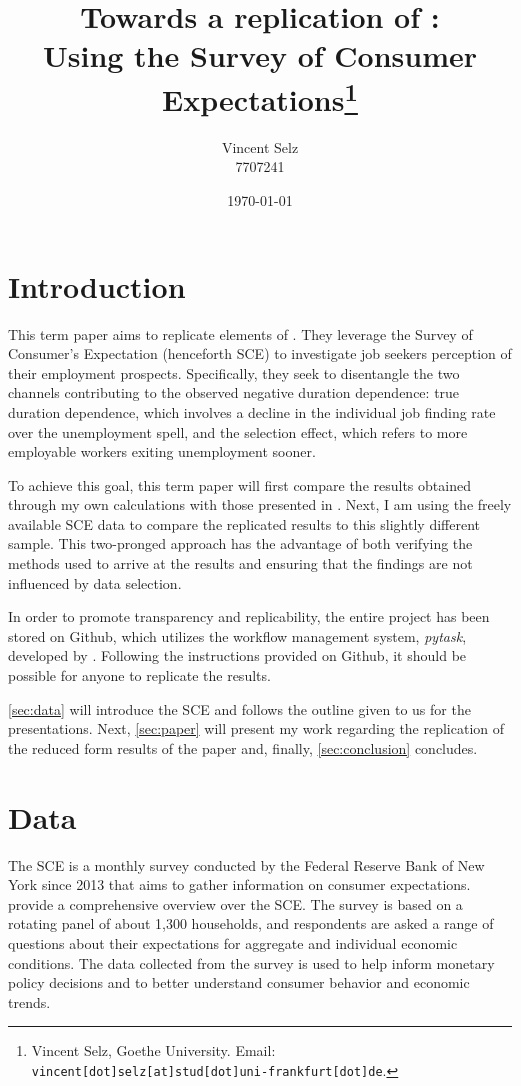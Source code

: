 \documentclass[11pt,a4paper,leqno]{article}
\title{Towards a replication of \textcite{MST2021}:  \\ Using the Survey of Consumer Expectations\thanks{Vincent Selz, Goethe University. Email: \texttt{vincent[dot]selz[at]stud[dot]uni-frankfurt[dot]de}. } }
\author{Vincent Selz \\ 7707241}
\date{
	\today
}
\begin{document}
\clearpage
\maketitle
\thispagestyle{empty}

\clearpage
\section{Introduction}
\setcounter{page}{1}
This term paper aims to replicate elements of \textcite{MST2021}. They leverage the Survey of Consumer's Expectation (henceforth SCE) to investigate job seekers perception of their employment prospects. Specifically, they seek to disentangle the two channels contributing to the observed negative duration dependence: true duration dependence, which involves a decline in the individual job finding rate over the unemployment spell, and the selection effect, which refers to more employable workers exiting unemployment sooner.

To achieve this goal, this term paper will first compare the results obtained through my own calculations with those presented in \textcite{MST2021}. Next, I am using the freely available SCE data to compare the replicated results to this slightly different sample. 
This two-pronged approach has the advantage of both verifying the methods used to arrive at the results and ensuring that the findings are not influenced by data selection.

In order to promote transparency and replicability, the entire project has been stored on Github, which utilizes the workflow management system, \textit{pytask}, developed by \textcite{Raabe2020}.  Following the instructions provided on Github, it should be possible for anyone  to replicate the results.

\autoref{sec:data} will introduce the SCE and follows the outline given to us for the presentations. Next,
\autoref{sec:paper} will present my work regarding the replication of the reduced form results of the paper and, finally,  \autoref{sec:conclusion} concludes.

\section{Data} \label{sec:data}
The SCE is a monthly survey conducted by the Federal Reserve Bank of New York since 2013 that aims to gather information on consumer expectations. \textcite{SCEOverview} provide a comprehensive overview over the SCE. The survey is based on a rotating panel of about 1,300 households, and respondents are asked a range of questions about their expectations for aggregate and individual economic conditions. The data collected from the survey is used to help inform monetary policy decisions and to better understand consumer behavior and economic trends.
\end{document}
